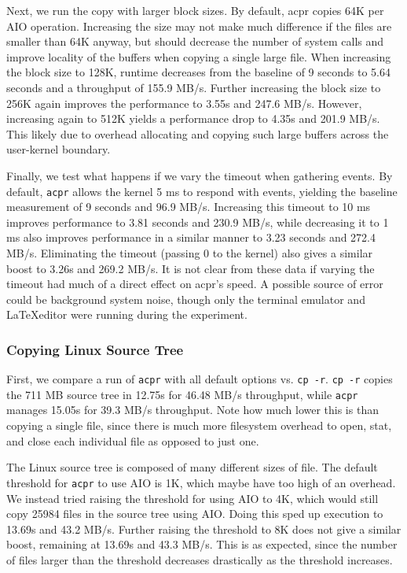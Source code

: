 \documentclass[11pt]{article}
\begin{document}
Next, we run the copy with larger block sizes. By default, acpr copies 64K per AIO operation. Increasing the size may not make much difference if the files are smaller than 64K anyway, but should decrease the number of system calls and improve locality of the buffers when copying a single large file. When increasing the block size to 128K, runtime decreases from the baseline of 9 seconds to 5.64 seconds and a throughput of 155.9 MB/s. Further increasing the block size to 256K again improves the performance to 3.55s and 247.6 MB/s. However, increasing again to 512K yields a performance drop to 4.35s and 201.9 MB/s. This likely due to overhead allocating and copying such large buffers across the user-kernel boundary.

Finally, we test what happens if we vary the timeout when gathering events. By default, \texttt{acpr} allows the kernel 5 ms to respond with events, yielding the baseline measurement of 9 seconds and 96.9 MB/s. Increasing this timeout to 10 ms improves performance to 3.81 seconds and 230.9 MB/s, while decreasing it to 1 ms also improves performance in a similar manner to 3.23 seconds and 272.4 MB/s. Eliminating the timeout (passing 0 to the kernel) also gives a similar boost to 3.26s and 269.2 MB/s. It is not clear from these data if varying the timeout had much of a direct effect on acpr's speed. A possible source of error could be background system noise, though only the terminal emulator and \LaTeX editor were running during the experiment.

\subsubsection{Copying Linux Source Tree}
First, we compare a run of \texttt{acpr} with all default options vs. \texttt{cp -r}. \texttt{cp -r} copies the 711 MB source tree in 12.75s for 46.48 MB/s throughput, while \texttt{acpr} manages 15.05s for 39.3 MB/s throughput. Note how much lower this is than copying a single file, since there is much more filesystem overhead to open, stat, and close each individual file as opposed to just one. 

The Linux source tree is composed of many different sizes of file. The default threshold for \texttt{acpr} to use AIO is 1K, which maybe have too high of an overhead. We instead tried raising the threshold for using AIO to 4K, which would still copy 25984 files in the source tree using AIO. Doing this sped up execution to 13.69s and 43.2 MB/s. Further raising the threshold to 8K does not give a similar boost, remaining at 13.69s and 43.3 MB/s. This is as expected, since the number of files larger than the threshold decreases drastically as the threshold increases.
\end{document}
